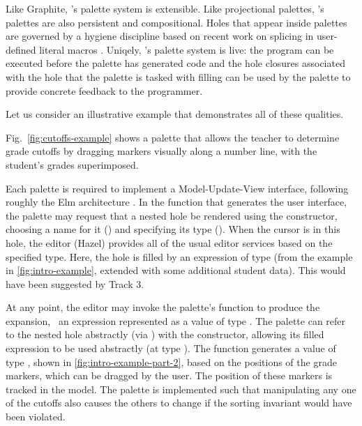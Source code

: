 Like Graphite, \Hazel's palette system is extensible. 
Like projectional palettes, \Hazel's palettes are also persistent and compositional. 
Holes that appear inside palettes
are governed by a hygiene discipline based on recent work on splicing in user-defined literal macros
\cite{tlms-icfp18}. 
Uniqely, \Hazel's palette system is live: the program 
can be executed before the palette has generated code
and the hole closures associated with the hole that the 
palette is tasked with filling can be used by the palette
to provide concrete feedback to the programmer.

Let us consider an illustrative example that demonstrates
all of these qualities. 

Fig.~\ref{fig:cutoffs-example} shows a palette that allows the teacher to determine grade cutoffs by dragging markers visually along a number line, with the student's grades superimposed.

%
Each palette is required to implement a
Model-Update-View interface, following roughly the Elm architecture \cite{ElmArchitecture}. 
In the function  that generates the user
interface, the palette may request that a nested hole be
rendered using the  constructor, choosing a
name for it () and specifying its type (). When the cursor is in this hole, the editor (Hazel) provides all of the usual editor services based on the specified type. Here, the  hole 
is filled by an expression  of type  (from the example in \autoref{fig:intro-example}, extended with some additional student data). This would have been suggested by Track 3.
%

At any point, the editor may invoke the palette's
 function to produce the expansion, \ie{}~an expression
represented as a value of type . The palette can refer to
the nested hole abstractly (via ) 
with the  constructor, allowing its filled
expression to be used abstractly (at type ). The  function generates a value of type ,
shown in \autoref{fig:intro-example-part-2}, based on the positions of the grade markers,
which can be dragged by the user. The position of these markers is tracked in the model. The palette is implemented such that manipulating any one of the cutoffs also causes the others to change if the sorting invariant would have been violated.

